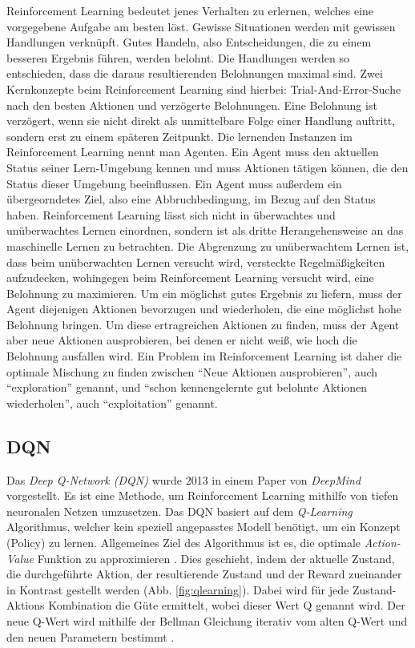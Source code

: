 \documentclass[12pt,a4paper]{article}
\begin{document}
Reinforcement Learning bedeutet jenes Verhalten zu erlernen, welches eine vorgegebene Aufgabe am besten l\"ost. Gewisse Situationen werden mit gewissen Handlungen verkn\"upft. Gutes Handeln, also Entscheidungen, die zu einem besseren Ergebnis f\"uhren, werden belohnt. Die Handlungen werden so entschieden, dass die daraus resultierenden Belohnungen maximal sind.
Zwei Kernkonzepte beim Reinforcement Learning sind hierbei: Trial-And-Error-Suche nach den besten Aktionen und verz\"ogerte Belohnungen. Eine Belohnung ist verz\"ogert, wenn sie nicht direkt als unmittelbare Folge einer Handlung auftritt, sondern erst zu einem sp\"ateren Zeitpunkt.
Die lernenden Instanzen im Reinforcement Learning nennt man Agenten. Ein Agent muss den aktuellen Status seiner Lern-Umgebung kennen und muss Aktionen t\"atigen k\"onnen, die den Status dieser Umgebung beeinflussen. Ein Agent muss außerdem ein \"ubergeorndetes Ziel, also eine Abbruchbedingung, im Bezug auf den Status haben.
Reinforcement Learning l\"asst sich nicht in \"uberwachtes und un\"uberwachtes Lernen einordnen, sondern ist als dritte Herangehensweise an das maschinelle Lernen zu betrachten. Die Abgrenzung zu un\"uberwachtem Lernen ist, dass beim un\"uberwachten Lernen versucht wird, versteckte Regelm\"aßigkeiten aufzudecken, wohingegen beim Reinforcement Learning versucht wird, eine Belohnung zu maximieren.
Um ein m\"oglichst gutes Ergebnis zu liefern, muss der Agent diejenigen Aktionen bevorzugen und wiederholen, die eine m\"oglichst hohe Belohnung bringen. Um diese ertragreichen Aktionen zu finden, muss der Agent aber neue Aktionen ausprobieren, bei denen er nicht weiß, wie hoch die Belohnung ausfallen wird. Ein Problem im Reinforcement Learning ist daher die optimale Mischung zu finden zwischen ``Neue Aktionen ausprobieren'', auch ``exploration'' genannt, und ``schon kennengelernte gut belohnte Aktionen wiederholen'', auch ``exploitation'' genannt.\cite{reinforcementlearning}

\newpage

\subsection{DQN}
Das \textit{Deep Q-Network (DQN)} wurde 2013 in einem Paper \cite{mnih:2013} von \textit{DeepMind} vorgestellt.
Es ist eine Methode, um Reinforcement Learning mithilfe von tiefen neuronalen Netzen umzusetzen.
Das DQN basiert auf dem \textit{Q-Learning} Algorithmus, welcher kein speziell angepasstes Modell benötigt, um ein Konzept (Policy) zu lernen.
Allgemeines Ziel des Algorithmus ist es, die optimale \textit{Action-Value} Funktion zu approximieren \cite[p. 1]{watkins:1992}.
Dies geschieht, indem der aktuelle Zustand, die durchgeführte Aktion, der resultierende Zustand und der Reward zueinander in Kontrast gestellt werden (Abb. \ref{fig:qlearning}).
Dabei wird für jede Zustand-Aktions Kombination die Güte ermittelt, wobei dieser Wert Q genannt wird.
Der neue Q-Wert wird mithilfe der Bellman Gleichung iterativ vom alten Q-Wert und den neuen Parametern bestimmt \cite[pp. 2--3]{mnih:2013}.
\end{document}
